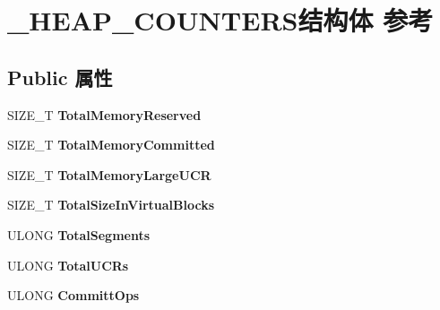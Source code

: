 \hypertarget{struct___h_e_a_p___c_o_u_n_t_e_r_s}{}\section{\+\_\+\+H\+E\+A\+P\+\_\+\+C\+O\+U\+N\+T\+E\+R\+S结构体 参考}
\label{struct___h_e_a_p___c_o_u_n_t_e_r_s}
\subsection*{Public 属性}
\begin{DoxyCompactItemize}
\item 
\mbox{\label{struct___h_e_a_p___c_o_u_n_t_e_r_s_a575dc6f08cb4286b17849cfde1b5fa38}} 
S\+I\+Z\+E\+\_\+T {\bfseries Total\+Memory\+Reserved}
\item 
\mbox{\label{struct___h_e_a_p___c_o_u_n_t_e_r_s_a2c297ac5923e108ae5608be9c9120be4}} 
S\+I\+Z\+E\+\_\+T {\bfseries Total\+Memory\+Committed}
\item 
\mbox{\label{struct___h_e_a_p___c_o_u_n_t_e_r_s_a16d6d48b0321a1232325a97bc91321f8}} 
S\+I\+Z\+E\+\_\+T {\bfseries Total\+Memory\+Large\+U\+CR}
\item 
\mbox{\label{struct___h_e_a_p___c_o_u_n_t_e_r_s_a4dbe14c205994a54fe0b88cc531e0575}} 
S\+I\+Z\+E\+\_\+T {\bfseries Total\+Size\+In\+Virtual\+Blocks}
\item 
\mbox{\label{struct___h_e_a_p___c_o_u_n_t_e_r_s_a7be30630ea4ec688f6804015263e3738}} 
U\+L\+O\+NG {\bfseries Total\+Segments}
\item 
\mbox{\label{struct___h_e_a_p___c_o_u_n_t_e_r_s_a4fcecb60a2cf6a7ceaea3ff3c21958c3}} 
U\+L\+O\+NG {\bfseries Total\+U\+C\+Rs}
\item 
\mbox{\label{struct___h_e_a_p___c_o_u_n_t_e_r_s_ab220bbca1d883bd75c889e2cc3a40317}} 
U\+L\+O\+NG {\bfseries Committ\+Ops}
\item 
\mbox{\label{struct___h_e_a_p___c_o_u_n_t_e_r_s_afba5ae65b0fc99373780571f73c7f46c}} 

\end{DoxyCompactItemize}
